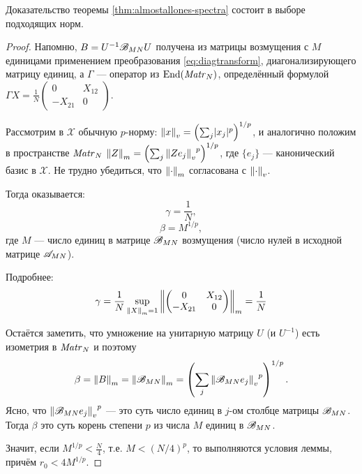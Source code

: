 Доказательство теоремы \ref{thm:almostallones-spectra}
состоит в выборе подходящих норм.
\begin{proof}
    Напомню, \( B = U^{-1} \perturbmatrix{M}{N} U \)
    получена из матрицы возмущения с \( M \) единицами применением преобразования \eqref{eq:diagtransform},
    диагонализирующего матрицу единиц,
    а \( \Gamma \) --- оператор из \( \End{\matr{N}{}} \),
    определённый формулой
    \( \Gamma X = \frac1N \begin{pmatrix}0 & X_{12} \\ -X_{21} & 0\end{pmatrix} \).

        Рассмотрим в \( \mathscr{X} \) обычную \(p\)-норму:
    \( \normex{v}{x} = \left(\sum_j \lvert x_j \rvert^p \right)^{1/p} \),
    и аналогично положим в пространстве \( \matr{N}{} \)
    \( \normex{m}{Z} = \left( \sum_j {\normex{v}{Z e_j}}^p \right)^{1/p} \),
    где \( \{ e_j \} \) --- канонический базис в \( \mathscr{X} \).
    Не трудно убедиться, что \( \normex{m}{\cdot} \) согласована с \( \normex{v}{\cdot} \).

    Тогда оказывается:
    \[ \gamma = \frac1N, \]
    \[  \beta = M^{1/p} ,\]
    где \( M \) --- число единиц в матрице \( \perturbmatrix{M}{N} \) возмущения
    (число нулей в исходной матрице \( \almostallones{M}{N} \)).

    Подробнее:
    \[ \gamma = \frac1N \sup_{\normex{m}{X}=1}\normex{m}{\begin{pmatrix}0 & X_{12} \\ -X_{21} & 0\end{pmatrix}} = \frac1N \]

    Остаётся заметить, что умножение на унитарную матрицу \( U \)
    (и \( U^{-1} \)) есть изометрия
    в \( \matr{N}{} \)
    и поэтому
    \[ \beta = \normex{m}{B} = \normex{m}{\perturbmatrix{M}{N}} = \left(\sum_j{\normex{v}{\perturbmatrix{M}{N}e_j}}^p\right)^{1/p}.\]
    Ясно, что \( {\normex{v}{\perturbmatrix{M}{N}e_j}}^p \) --- это суть число единиц в \( j \)-ом столбце
    матрицы \( \perturbmatrix{M}{N} \).
    Тогда \( \beta \) это суть корень степени \( p \) из числа \( M \) единиц в \( \perturbmatrix{M}{N} \).

    Значит, если
    \( M^{1/p} < \frac{N}{4} \), т.е. \( M < \left(N/4\right)^p \),
    то выполняются условия леммы,
    причём \( r_0 < 4M^{1/p} \).
\end{proof}
